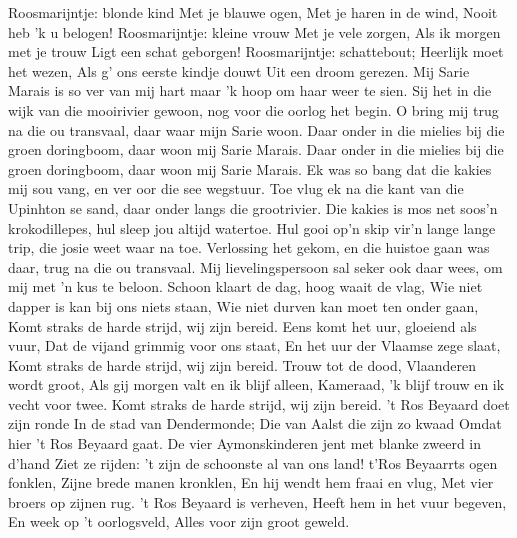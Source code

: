 \documentclass{article}
\begin{document}
\begin{songs}{}
Roosmarijntje: blonde kind
Met je blauwe ogen,
Met je haren in de wind,
Nooit heb 'k u belogen!
\endverse
\beginverse*
Roosmarijntje: kleine vrouw
Met je vele zorgen,
Als ik morgen met je trouw
Ligt een schat geborgen!
\endverse
\beginverse*
Roosmarijntje: schattebout;
Heerlijk moet het wezen,
Als g’ ons eerste kindje douwt
Uit een droom gerezen. 
\endverse
\endsong
{}
\beginverse*
Mij Sarie Marais is so ver van mij hart
maar 'k hoop om haar weer te sien.
Sij het in die wijk van die mooirivier gewoon,
nog voor die oorlog het begin.
\endverse
\beginchorus
O bring mij trug na die ou transvaal,
daar waar mijn Sarie woon.
Daar onder in die mielies bij die groen doringboom,
daar woon mij Sarie Marais.
Daar onder in die mielies bij die groen doringboom,
daar woon mij Sarie Marais.
\endchorus
\beginverse*
Ek was so bang dat die kakies mij sou vang,
en ver oor die see wegstuur.
Toe vlug ek na die kant van die Upinhton se sand,
daar onder langs die grootrivier.
\endverse
\beginverse*
Die kakies is mos net soos’n krokodillepes,
hul sleep jou altijd watertoe.
Hul gooi op’n skip vir’n lange lange trip,
die josie weet waar na toe.
\endverse
\beginverse*
Verlossing het gekom, en die huistoe gaan was daar,
trug na die ou transvaal.
Mij lievelingspersoon sal seker ook daar wees,
om mij met 'n kus te beloon.
\endverse
\endsong
{}
\beginverse*
Schoon klaart de dag, hoog waait de vlag,
Wie niet dapper is kan bij ons niets staan,
Wie niet durven kan moet ten onder gaan,
Komt straks de harde strijd, wij zijn bereid.
\endverse
\beginverse*
Eens komt het uur, gloeiend als vuur,
Dat de vijand grimmig voor ons staat,
En het uur der Vlaamse zege slaat,
Komt straks de harde strijd, wij zijn bereid.
\endverse
\beginverse*
Trouw tot de dood, Vlaanderen wordt groot,
Als gij morgen valt en ik blijf alleen,
Kameraad, 'k blijf trouw en ik vecht voor twee.
Komt straks de harde strijd, wij zijn bereid.
\endverse
\endsong
{}
\beginverse*
't Ros Beyaard doet zijn ronde 
In de stad van Dendermonde; 
Die van Aalst die zijn zo kwaad
Omdat hier 't Ros Beyaard gaat. 
\endverse
\beginverse*
De vier Aymonskinderen jent 
met blanke zweerd in d'hand 
Ziet ze rijden: 't zijn de
schoonste al van ons land! 
\endverse
\beginverse*
t'Ros Beyaarrts ogen fonklen,
Zijne brede manen kronklen,
En hij wendt hem fraai en vlug,
Met vier broers op zijnen rug.
\endverse
\beginverse*
't Ros Beyaard is verheven,
Heeft hem in het vuur begeven,
En week op 't oorlogsveld,
Alles voor zijn groot geweld.
\endverse
\endsong
{}
\beginverse*

\end{songs}
\end{document}
